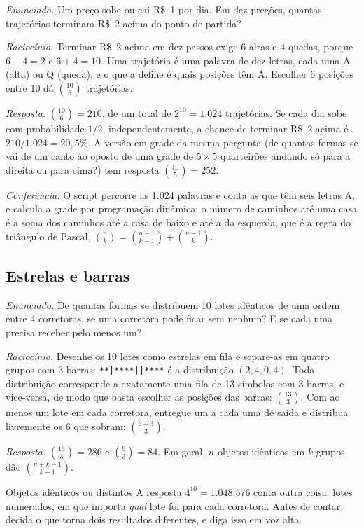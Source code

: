\emph{Enunciado.} Um preço sobe ou cai R\$~1 por dia. Em dez pregões, quantas trajetórias terminam R\$~2 acima do ponto de partida?

\emph{Raciocínio.} Terminar R\$~2 acima em dez passos exige 6 altas e 4 quedas, porque $6 - 4 = 2$ e $6 + 4 = 10$. Uma trajetória é uma palavra de dez letras, cada uma A (alta) ou Q (queda), e o que a define é quais posições têm A. Escolher 6 posições entre 10 dá $\binom{10}{6}$ trajetórias.

\emph{Resposta.} $\binom{10}{6} = 210$, de um total de $2^{10} = 1.024$ trajetórias. Se cada dia sobe com probabilidade $1/2$, independentemente, a chance de terminar R\$~2 acima é $210/1.024 = 20,5\%$. A versão em grade da mesma pergunta (de quantas formas se vai de um canto ao oposto de uma grade de $5 \times 5$ quarteirões andando só para a direita ou para cima?) tem resposta $\binom{10}{5} = 252$.

\emph{Conferência.} O script percorre as 1.024 palavras e conta as que têm seis letras A, e calcula a grade por programação dinâmica: o número de caminhos até uma casa é a soma dos caminhos até a casa de baixo e até a da esquerda, que é a regra do triângulo de Pascal, $\binom{n}{k} = \binom{n-1}{k-1} + \binom{n-1}{k}$.

\subsection{Estrelas e barras}

\emph{Enunciado.} De quantas formas se distribuem 10 lotes idênticos de uma ordem entre 4 corretoras, se uma corretora pode ficar sem nenhum? E se cada uma precisa receber pelo menos um?

\emph{Raciocínio.} Desenhe os 10 lotes como estrelas em fila e separe-as em quatro grupos com 3 barras: \texttt{**|****||****} é a distribuição $(2, 4, 0, 4)$. Toda distribuição corresponde a exatamente uma fila de 13 símbolos com 3 barras, e vice-versa, de modo que basta escolher as posições das barras: $\binom{13}{3}$. Com ao menos um lote em cada corretora, entregue um a cada uma de saída e distribua livremente os 6 que sobram: $\binom{6+3}{3}$.

\emph{Resposta.} $\binom{13}{3} = 286$ e $\binom{9}{3} = 84$. Em geral, $n$ objetos idênticos em $k$ grupos dão $\binom{n+k-1}{k-1}$.

\begin{armadilha}{Objetos idênticos ou distintos}
A resposta $4^{10} = 1.048.576$ conta outra coisa: lotes numerados, em que importa \emph{qual} lote foi para cada corretora. Antes de contar, decida o que torna dois resultados diferentes, e diga isso em voz alta.
\end{armadilha}

